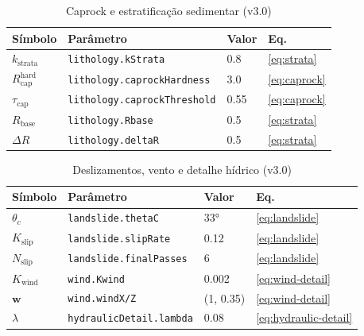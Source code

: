 \documentclass[11pt,a4paper]{article}
\begin{document}
\begin{table}[H]
\centering
\caption{Caprock e estratificação sedimentar (v3.0)}
\label{tab:strata}
\begin{tabular}{@{}llll@{}}
\toprule
\textbf{Símbolo} & \textbf{Parâmetro} & \textbf{Valor} & \textbf{Eq.} \\
\midrule
$k_{\text{strata}}$ & \texttt{lithology.kStrata} & 0.8 & \eqref{eq:strata} \\
$R_{\text{cap}}^{\text{hard}}$ & \texttt{lithology.caprockHardness} & 3.0 & \eqref{eq:caprock} \\
$\tau_{\text{cap}}$ & \texttt{lithology.caprockThreshold} & 0.55 & \eqref{eq:caprock} \\
$R_{\text{base}}$ & \texttt{lithology.Rbase} & 0.5 & \eqref{eq:strata} \\
$\Delta R$ & \texttt{lithology.deltaR} & 0.5 & \eqref{eq:strata} \\
\bottomrule
\end{tabular}
\end{table}

\begin{table}[H]
\centering
\caption{Deslizamentos, vento e detalhe hídrico (v3.0)}
\label{tab:postpass}
\begin{tabular}{@{}llll@{}}
\toprule
\textbf{Símbolo} & \textbf{Parâmetro} & \textbf{Valor} & \textbf{Eq.} \\
\midrule
$\theta_c$    & \texttt{landslide.thetaC}     & 33°   & \eqref{eq:landslide} \\
$K_{\text{slip}}$ & \texttt{landslide.slipRate} & 0.12  & \eqref{eq:landslide} \\
$N_{\text{slip}}$ & \texttt{landslide.finalPasses}& 6  & \eqref{eq:landslide} \\
$K_{\text{wind}}$ & \texttt{wind.Kwind}       & 0.002 & \eqref{eq:wind-detail} \\
$\mathbf{w}$  & \texttt{wind.windX/Z}         & (1, 0.35) & \eqref{eq:wind-detail} \\
$\lambda$     & \texttt{hydraulicDetail.lambda}& 0.08 & \eqref{eq:hydraulic-detail} \\
\bottomrule
\end{tabular}
\end{table}
\end{document}
